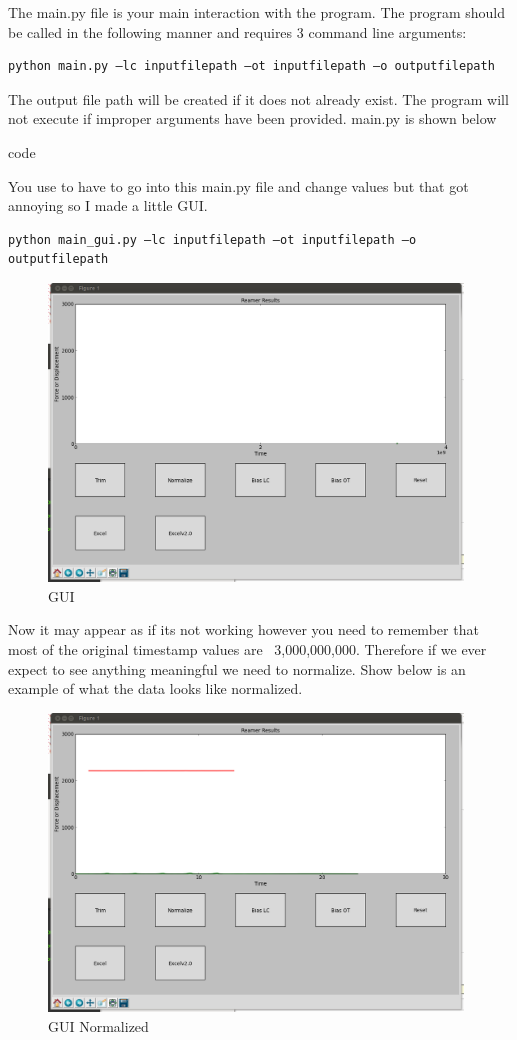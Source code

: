 \documentclass[pdftex,11pt,letterpaper]{article}
\begin{document}
The main.py file is your main interaction with the program. The program should be called in the following manner and requires 3 command line arguments:

\begin{lstlisting}
python main.py –lc inputfilepath –ot inputfilepath –o outputfilepath
\end{lstlisting}

The output file path will be created if it does not already exist. The program will not execute if improper arguments have been provided.  main.py is shown below

code

You use to have to go into this main.py file and change values but that got annoying so I made a little GUI. 

\begin{lstlisting}
python main_gui.py –lc inputfilepath –ot inputfilepath –o outputfilepath
\end{lstlisting}


\begin{figure}[ht!]
\centering
\includegraphics[width=110mm]{./images/gui}
\caption{GUI}
\end{figure}


Now it may appear as if its not working however you need to remember that most of the original timestamp values are ~3,000,000,000. Therefore if we ever expect to see anything meaningful we need to normalize. Show below is an example of what the data looks like normalized. \\

\begin{figure}[ht!]
\centering
\includegraphics[width=110mm]{./images/gui2}
\caption{GUI Normalized}
\end{figure}
\end{document}
